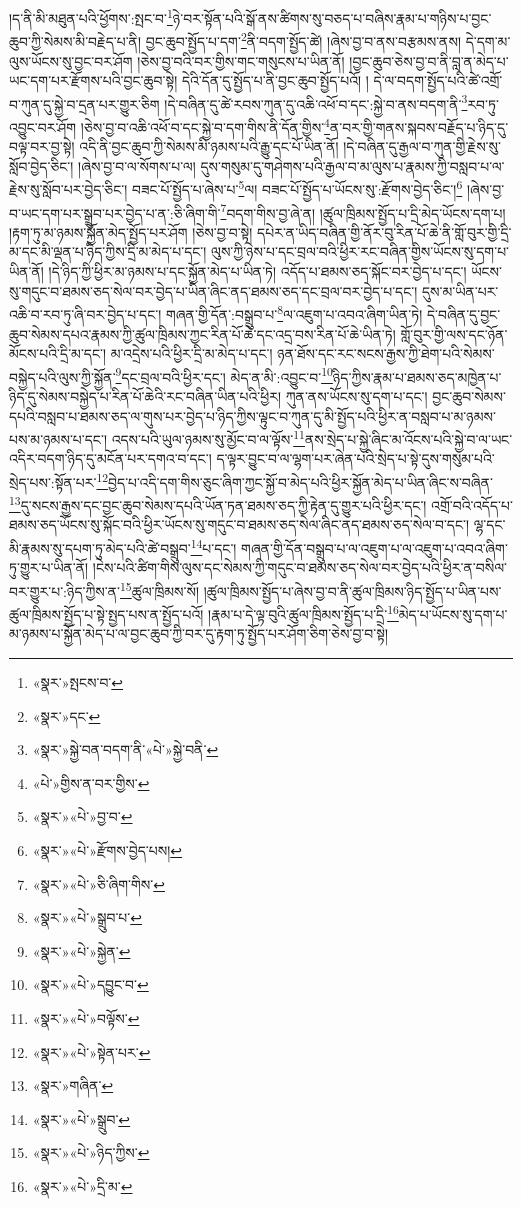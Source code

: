 །ད་ནི་མི་མཐུན་པའི་ཕྱོགས་:སྤང་བ་\footnote{«སྣར་»སྤངས་བ་}ཉེ་བར་སྟོན་པའི་སྒོ་ནས་ཚིགས་སུ་བཅད་པ་བཞིས་རྣམ་པ་གཉིས་པ་བྱང་ཆུབ་ཀྱི་སེམས་མི་བརྗེད་པ་ནི། བྱང་ཆུབ་སྤྱོད་པ་དག་\footnote{«སྣར་»དང་}ནི་བདག་སྤྱོད་ཚེ། །ཞེས་བྱ་བ་ནས་བརྩམས་ནས། དེ་དག་མ་ལུས་ཡོངས་སུ་བྱང་བར་ཤོག །ཅེས་བྱ་བའི་བར་གྱིས་གང་གསུངས་པ་ཡིན་ནོ། །བྱང་ཆུབ་ཅེས་བྱ་བ་ནི་བླ་ན་མེད་པ་ཡང་དག་པར་རྫོགས་པའི་བྱང་ཆུབ་སྟེ། དེའི་དོན་དུ་སྤྱོད་པ་ནི་བྱང་ཆུབ་སྤྱོད་པའོ། །
དེ་ལ་བདག་སྤྱོད་པའི་ཚེ་འགྲོ་བ་ཀུན་དུ་སྐྱེ་བ་དྲན་པར་གྱུར་ཅིག །དེ་བཞིན་དུ་ཚེ་རབས་ཀུན་དུ་འཆི་འཕོ་བ་དང་:སྐྱེ་བ་ནས་བདག་ནི་\footnote{«སྣར་»སྐྱེ་བན་བདག་ནི་«པེ་»སྐྱེ་བནི་}རབ་ཏུ་འབྱུང་བར་ཤོག །ཅེས་བྱ་བ་འཆི་འཕོ་བ་དང་སྐྱེ་བ་དག་གིས་ནི་དོན་གྱིས་\footnote{«པེ་»གྱིས་ན་བར་གྱིས་}ན་བར་གྱི་གནས་སྐབས་བརྗོད་པ་ཉིད་དུ་བལྟ་བར་བྱ་སྟེ། འདི་ནི་བྱང་ཆུབ་ཀྱི་སེམས་མི་ཉམས་པའི་རྒྱུ་དང་པོ་ཡིན་ནོ། །དེ་བཞིན་དུ་རྒྱལ་བ་ཀུན་གྱི་རྗེས་སུ་སློབ་བྱེད་ཅིང་། །ཞེས་བྱ་བ་ལ་སོགས་པ་ལ། དུས་གསུམ་དུ་གཤེགས་པའི་རྒྱལ་བ་མ་ལུས་པ་རྣམས་ཀྱི་བསླབ་པ་ལ་རྗེས་སུ་སློབ་པར་བྱེད་ཅིང་། བཟང་པོ་སྤྱོད་པ་ཞེས་པ་\footnote{«སྣར་»«པེ་»བྱ་བ་}ལ། བཟང་པོ་སྤྱོད་པ་ཡོངས་སུ་:རྫོགས་བྱེད་ཅིང་།\footnote{«སྣར་»«པེ་»རྫོགས་བྱེད་པས།} །ཞེས་བྱ་བ་ཡང་དག་པར་སྒྲུབ་པར་བྱེད་པ་ན་:ཅི་ཞིག་གི་\footnote{«སྣར་»«པེ་»ཅི་ཞིག་གིས་}བདག་གིས་བྱ་ཞེ་ན། །ཚུལ་ཁྲིམས་སྤྱོད་པ་དྲི་མེད་ཡོངས་དག་པ། །རྟག་ཏུ་མ་ཉམས་སྐྱོན་མེད་སྤྱོད་པར་ཤོག །ཅེས་བྱ་བ་སྟེ། དཔེར་ན་ཡིད་བཞིན་གྱི་ནོར་བུ་རིན་པོ་ཆེ་ནི་གློ་བུར་གྱི་དྲི་མ་དང་མི་ལྡན་པ་ཉིད་ཀྱིས་དྲི་མ་མེད་པ་དང་། ལུས་ཀྱི་ཉེས་པ་དང་བྲལ་བའི་ཕྱིར་རང་བཞིན་གྱིས་ཡོངས་སུ་དག་པ་ཡིན་ནོ། །དེ་ཉིད་ཀྱི་ཕྱིར་མ་ཉམས་པ་དང་སྐྱོན་མེད་པ་ཡིན་ཏེ། འདོད་པ་ཐམས་ཅད་སྐོང་བར་བྱེད་པ་དང་། ཡོངས་སུ་གདུང་བ་ཐམས་ཅད་སེལ་བར་བྱེད་པ་ཡིན་ཞིང་ནད་ཐམས་ཅད་དང་བྲལ་བར་བྱེད་པ་དང་། དུས་མ་ཡིན་པར་འཆི་བ་རབ་ཏུ་ཞི་བར་བྱེད་པ་དང་། གཞན་གྱི་དོན་:བསྒྲུབ་པ་\footnote{«སྣར་»«པེ་»སྒྲུབ་པ་}ལ་འཇུག་པ་འབའ་ཞིག་ཡིན་ཏེ། དེ་བཞིན་དུ་བྱང་ཆུབ་སེམས་དཔའ་རྣམས་ཀྱི་ཚུལ་ཁྲིམས་ཀྱང་རིན་པོ་ཆེ་དང་འདྲ་བས་རིན་པོ་ཆེ་ཡིན་ཏེ། གློ་བུར་གྱི་ལས་དང་ཉོན་མོངས་པའི་དྲི་མ་དང་། མ་འདྲེས་པའི་ཕྱིར་དྲི་མ་མེད་པ་དང་། ཉན་ཐོས་དང་རང་སངས་རྒྱས་ཀྱི་ཐེག་པའི་སེམས་བསྐྱེད་པའི་ལུས་ཀྱི་སྐྱོན་\footnote{«སྣར་»«པེ་»སྐྱེན་}དང་བྲལ་བའི་ཕྱིར་དང་། མེད་ན་མི་:འབྱུང་བ་\footnote{«སྣར་»«པེ་»དབྱུང་བ་}ཉིད་ཀྱིས་རྣམ་པ་ཐམས་ཅད་མཁྱེན་པ་ཉིད་དུ་སེམས་བསྐྱེད་པ་རིན་པོ་ཆེའི་རང་བཞིན་ཡིན་པའི་ཕྱིར། ཀུན་ནས་ཡོངས་སུ་དག་པ་དང་། བྱང་ཆུབ་སེམས་དཔའི་བསླབ་པ་ཐམས་ཅད་ལ་གུས་པར་བྱེད་པ་ཉིད་ཀྱིས་ལྟུང་བ་ཀུན་དུ་མི་སྤྱོད་པའི་ཕྱིར་ན་བསླབ་པ་མ་ཉམས་པས་མ་ཉམས་པ་དང་། འདས་པའི་ཡུལ་ཉམས་སུ་མྱོང་བ་ལ་ལྟོས་\footnote{«སྣར་»«པེ་»བལྟོས་}ནས་སྲེད་པ་སྐྱེ་ཞིང་མ་འོངས་པའི་སྐྱེ་བ་ལ་ཡང་འདིར་བདག་ཉིད་དུ་མངོན་པར་དགའ་བ་དང་། ད་ལྟར་བྱུང་བ་ལ་ལྷག་པར་ཞེན་པའི་སྲེད་པ་སྟེ་དུས་གསུམ་པའི་སྲེད་པས་:སྟོན་པར་\footnote{«སྣར་»«པེ་»སྟེན་པར་}བྱེད་པ་འདི་དག་གིས་ཅུང་ཞིག་ཀྱང་སྐྱོ་བ་མེད་པའི་ཕྱིར་སྐྱོན་མེད་པ་ཡིན་ཞིང་ས་བཞིན་\footnote{«སྣར་»གཞིན་}དུ་སངས་རྒྱས་དང་བྱང་ཆུབ་སེམས་དཔའི་ཡོན་ཏན་ཐམས་ཅད་ཀྱི་རྟེན་དུ་གྱུར་པའི་ཕྱིར་དང་། འགྲོ་བའི་འདོད་པ་ཐམས་ཅད་ཡོངས་སུ་སྐོང་བའི་ཕྱིར་ཡོངས་སུ་གདུང་བ་ཐམས་ཅད་སེལ་ཞིང་ནད་ཐམས་ཅད་སེལ་བ་དང་། ལྷ་དང་མི་རྣམས་སུ་དཔག་ཏུ་མེད་པའི་ཚེ་བསྒྲུབ་\footnote{«སྣར་»«པེ་»སྒྲུབ་}པ་དང་། གཞན་གྱི་དོན་བསྒྲུབ་པ་ལ་འཇུག་པ་ལ་འཇུག་པ་འབའ་ཞིག་ཏུ་གྱུར་པ་ཡིན་ནོ། །ངེས་པའི་ཚིག་གིས་ལུས་དང་སེམས་ཀྱི་གདུང་བ་ཐམས་ཅད་སེལ་བར་བྱེད་པའི་ཕྱིར་ན་བསིལ་བར་གྱུར་པ་:ཉིད་ཀྱིས་ན་\footnote{«སྣར་»«པེ་»ཉིད་ཀྱིས་}ཚུལ་ཁྲིམས་སོ། །ཚུལ་ཁྲིམས་སྤྱོད་པ་ཞེས་བྱ་བ་ནི་ཚུལ་ཁྲིམས་ཉིད་སྤྱོད་པ་ཡིན་པས་ཚུལ་ཁྲིམས་སྤྱོད་པ་སྟེ་སྤྱད་པས་ན་སྤྱོད་པའོ། །རྣམ་པ་དེ་ལྟ་བུའི་ཚུལ་ཁྲིམས་སྤྱོད་པ་དྲི་\footnote{«སྣར་»«པེ་»དྲི་མ་}མེད་པ་ཡོངས་སུ་དག་པ་མ་ཉམས་པ་སྐྱོན་མེད་པ་ལ་བྱང་ཆུབ་ཀྱི་བར་དུ་རྟག་ཏུ་སྤྱོད་པར་ཤོག་ཅིག་ཅེས་བྱ་བ་སྟེ། 